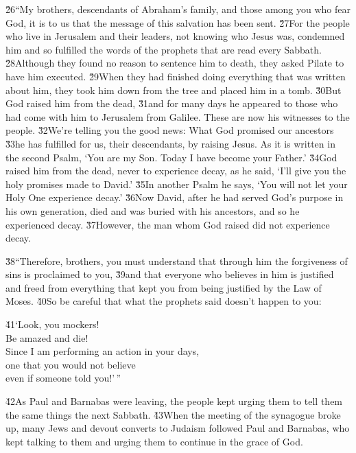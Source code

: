 \v{26}``My brothers, descendants of Abraham's family, and those among you who fear God, it is to us that the message of this salvation has been sent. \v{27}For the people who live in Jerusalem and their leaders, not knowing who Jesus was, condemned him and so fulfilled the words of the prophets that are read every Sabbath. \v{28}Although they found no reason to sentence him to death, they asked Pilate to have him executed. \v{29}When they had finished doing everything that was written about him, they took him down from the tree and placed him in a tomb. \v{30}But God raised him from the dead, \v{31}and for many days he appeared to those who had come with him to Jerusalem from Galilee. These are now his witnesses to the people. \v{32}We're telling you the good news: What God promised our ancestors \v{33}he has fulfilled for us, their descendants, by raising Jesus. As it is written in the second Psalm, `You are my Son. Today I have become your Father.' \v{34}God raised him from the dead, never to experience decay, as he said, `I'll give you the holy promises made to David.' \v{35}In another Psalm he says, `You will not let your Holy One experience decay.' \v{36}Now David, after he had served God's purpose in his own generation, died and was buried with his ancestors, and so he experienced decay. \v{37}However, the man whom God raised did not experience decay.

\v{38}``Therefore, brothers, you must understand that through him the forgiveness of sins is proclaimed to you, \v{39}and that everyone who believes in him is justified and freed from everything that kept you from being justified by the Law of Moses. \v{40}So be careful that what the prophets said doesn't happen to you:

\begin{poetry}
\poeml \v{41}`Look, you mockers! \\
\poemll    Be amazed and die! \\
\poeml Since I am performing an action in your days, \\
\poemll    one that you would not believe \\
\poemlll       even if someone told you!'\,''
\end{poetry}

\v{42}As Paul and Barnabas were leaving, the people kept urging them to tell them the same things the next Sabbath. \v{43}When the meeting of the synagogue broke up, many Jews and devout converts to Judaism followed Paul and Barnabas, who kept talking to them and urging them to continue in the grace of God.

